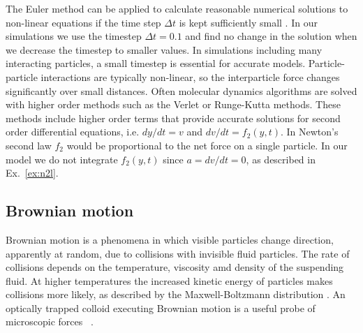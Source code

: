 \documentclass[twocolumn,preprintnumbers,amsmath,amssymb,aps,prx]{revtex4}
\begin{document}
    The Euler method can be applied to
    calculate reasonable numerical solutions to 
    non-linear
    equations if the time step $\Delta t$
    is kept sufficiently small \cite{Newman}.
    In our simulations we use the timestep $\Delta t = 0.1$
    and find no change in the solution
    when we decrease the timestep to smaller values.
    In simulations
    including many interacting particles,
    a small
    timestep is essential for accurate models.
    Particle-particle interactions are typically non-linear,
    so the interparticle force changes significantly over small distances.
  Often molecular dynamics algorithms 
  are solved with higher order methods
  such as the Verlet or Runge-Kutta methods.
  These methods include  higher order terms
  that provide accurate solutions for
  second order differential equations,
  i.e. $dy/dt = v$ and $dv/dt = f_2(y,t)$.
  In Newton's second law $f_2$ would be proportional
  to the net force on a single particle.
  In our model 
  we do not integrate $f_2(y,t)$ since 
  $a = dv/dt = 0$,
  as described in Ex.~\ref{ex:n2l}.
  
  \subsection{Brownian motion}
  \label{ex:brownian}
  Brownian motion is a phenomena in which 
  visible particles change direction,
  apparently at random, 
  due to collisions with invisible fluid particles.
  The rate of collisions depends on the temperature, viscosity
  amd density of 
  the suspending fluid.
  At higher temperatures
  the increased kinetic energy of particles
  makes collisions more likely, 
  as described by the Maxwell-Boltzmann distribution \cite{Einstein1905}.
  An optically trapped colloid executing Brownian motion
  is a useful probe of microscopic forces ~\cite{Volpe2013}.
  
\end{document}
